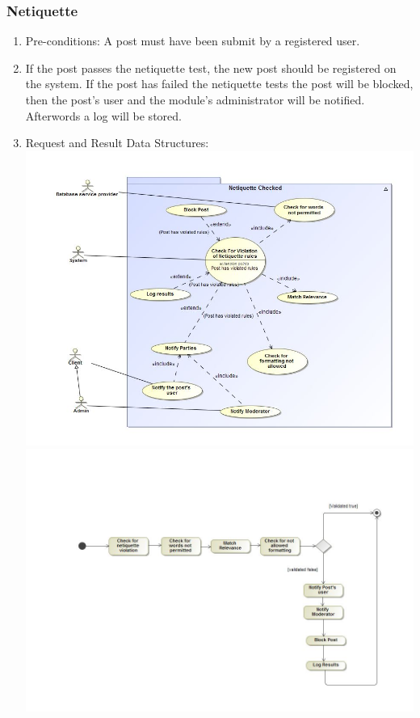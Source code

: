 \documentclass[hidelinks, 12pt, oneside]{article}
\begin{document}
\subsubsection{Netiquette}
\begin{enumerate}
 \item Pre-conditions: A post must have been submit by a registered user.
 \\
 
 \item If the post passes the netiquette test, the new post should be registered on the system. If the post has failed the netiquette tests the post will be blocked, then the post's user and the module's administrator will be notified. Afterwords a log will be stored.  
   \\
 \item Request and Result Data Structures:\\
  \includegraphics[scale=0.4]{netiquetteUseCase}\\
 \includegraphics[scale=0.35]{NetiquetteActivityDiagram} 
\end{enumerate}
\end{document}
